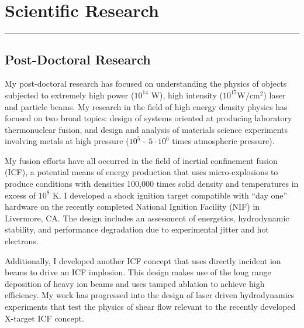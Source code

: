 \documentclass[letterpaper,10pt]{article}
\begin{document}
\section*{Scientific Research}
\hrule
\vspace{0.07in}

\subsection*{Post-Doctoral Research}
My post-doctoral research has focused on understanding the physics of objects
subjected to extremely high power ($10^{14}$ W), high intensity ($10^{15}
\text{W}/\text{cm}^2$) laser and particle beams.  My research in the field of
high energy density physics has focused on two broad topics: design of systems
oriented at producing laboratory thermonuclear fusion, and design and analysis
of materials science experiments involving metals at high pressure ($10^5$ - $5
\cdot 10^6$ times atmospheric pressure).

\vspace{0.1in}

My fusion efforts have all occurred in the field of inertial confinement
fusion (ICF), a potential means of energy production that uses
micro-explosions to produce conditions with densities 100,000 times solid
density and temperatures in excess of $10^8$ K.  I developed a shock ignition
target compatible with ``day one'' hardware on the recently completed National
Ignition Facility (NIF) in Livermore, CA\@.  The design includes an assessment
of energetics, hydrodynamic stability, and performance degradation due to
experimental jitter and hot electrons.

\vspace{0.1in}

Additionally, I developed another ICF concept that uses directly incident ion
beams to drive an ICF implosion.  This design makes use of the long range
deposition of heavy ion beams and uses tamped ablation to achieve high
efficiency.  My work has progressed into the design of laser driven
hydrodynamics experiments that test the physics of shear flow
relevant to the recently developed X-target ICF concept.

\vspace{0.1in}
\end{document}
